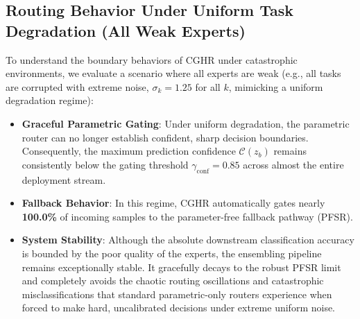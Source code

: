 \documentclass{article}
\theoremstyle{plain}
\theoremstyle{definition}
\theoremstyle{remark}
\begin{document}
\subsection{Routing Behavior Under Uniform Task Degradation (All Weak Experts)}
To understand the boundary behaviors of CGHR under catastrophic environments, we evaluate a scenario where all experts are weak (e.g., all tasks are corrupted with extreme noise, $\sigma_k = 1.25$ for all $k$, mimicking a uniform degradation regime):
\begin{itemize}
    \item \textbf{Graceful Parametric Gating}: Under uniform degradation, the parametric router can no longer establish confident, sharp decision boundaries. Consequently, the maximum prediction confidence $\mathcal{C}(z_b)$ remains consistently below the gating threshold $\gamma_{\text{conf}} = 0.85$ across almost the entire deployment stream.
    \item \textbf{Fallback Behavior}: In this regime, CGHR automatically gates nearly \textbf{100.0\%} of incoming samples to the parameter-free fallback pathway (PFSR). 
    \item \textbf{System Stability}: Although the absolute downstream classification accuracy is bounded by the poor quality of the experts, the ensembling pipeline remains exceptionally stable. It gracefully decays to the robust PFSR limit and completely avoids the chaotic routing oscillations and catastrophic misclassifications that standard parametric-only routers experience when forced to make hard, uncalibrated decisions under extreme uniform noise.
\end{itemize}
\end{document}
